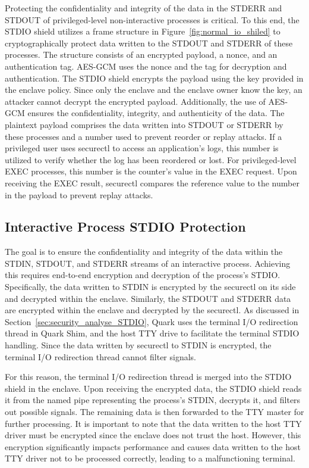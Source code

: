 Protecting the confidentiality and integrity of the data in the STDERR and STDOUT of privileged-level non-interactive processes is critical. To this end, the STDIO shield utilizes a frame structure in Figure~\ref{fig:normal_io_shiled} to cryptographically protect data written to the STDOUT and STDERR of these processes. The structure consists of an 
encrypted payload, a nonce, and an authentication tag. AES-GCM uses the nonce and the tag for decryption and authentication. The STDIO shield encrypts the payload using the key provided in the enclave policy. Since only the enclave and the enclave owner know the key, an attacker cannot decrypt the encrypted payload. Additionally, the use of AES-GCM ensures the 
confidentiality, integrity, and authenticity of the data. The plaintext payload comprises the data written into STDOUT or STDERR by these processes and a number used to prevent reorder or replay attacks. If a privileged user uses securectl to access an application’s logs, this number is utilized to verify whether the log has been reordered or lost. 
For privileged-level EXEC processes, this number is the counter’s value in the EXEC request. Upon receiving the EXEC result, securectl compares the reference value to the number in the payload to prevent replay attacks.


\subsection{Interactive Process STDIO Protection}
\label{subsec:design_terminal}


The goal is to ensure the confidentiality and integrity of the data within the STDIN, STDOUT, and STDERR streams of an interactive process. Achieving this requires end-to-end encryption and decryption of the process's STDIO. Specifically, the data written to STDIN is encrypted by the securectl on its side and decrypted within the enclave. Similarly, 
the STDOUT and STDERR data are encrypted within the enclave and decrypted by the securectl. As discussed in Section~\ref{sec:security_analyse_STDIO}, Quark uses the terminal I/O redirection thread in Quark Shim, and the host TTY drive to facilitate the terminal STDIO handling. Since the data written by securectl to STDIN is encrypted, the terminal 
I/O redirection thread cannot filter signals.

For this reason, the terminal I/O redirection thread is merged into the STDIO shield in the enclave. Upon receiving the encrypted data, the STDIO shield reads it from the named pipe representing the process's STDIN, decrypts it, and filters out possible signals. The remaining data is then forwarded to the TTY master for further processing. It is important 
to note that the data written to the host TTY driver must be encrypted since the enclave does not trust the host. However, this encryption significantly impacts performance and causes data written to the host TTY driver not to be processed correctly, leading to a malfunctioning terminal.

